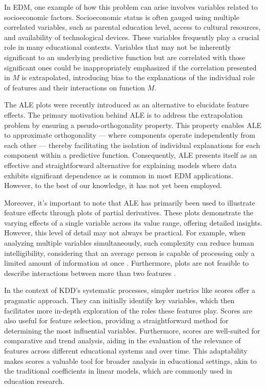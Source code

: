 In \gls{EDM}, one example of how this problem can arise involves variables related to socioeconomic factors. Socioeconomic status is often gauged using multiple correlated variables, such as parental education level, access to cultural resources, and availability of technological devices. These variables frequently play a crucial role in many educational contexts. Variables that may not be inherently significant to an underlying predictive function but are correlated with those significant ones could be inappropriately emphasized if the correlation presented in \(M\) is extrapolated,  introducing bias to the explanations of the individual role of features and their interactions on function \(M\).

The \gls{ALE} plots \cite{Apley2020VisualizingModels} were recently introduced as an alternative to elucidate feature effects. The primary motivation behind \gls{ALE} is to address the extrapolation problem by ensuring a pseudo-orthogonality property. This property enables ALE to approximate orthogonality — where components operate independently from each other — thereby facilitating the isolation of individual explanations for each component within a predictive function. Consequently, \gls{ALE} presents itself as an effective and straightforward alternative for explaining models where data exhibits significant dependence as is common in most \gls{EDM} applications. However, to the best of our knowledge, it has not yet been employed. 

Moreover, it's important to note that \gls{ALE} has primarily been used to illustrate feature effects through plots of partial derivatives. These plots demonstrate the varying effects of a single variable across its value range, offering detailed insights. However, this level of detail may not always be practical. For example, when analyzing multiple variables simultaneously, such complexity can reduce human intelligibility, considering that an average person is capable of processing only a limited amount of information at once \cite{Miller1956TheInformation.}. Furthermore, plots are not feasible to describe interactions between more than two features \cite{Apley2020VisualizingModels}.

In the context of \gls{KDD}'s systematic processes, simpler metrics like scores offer a pragmatic approach. They can initially identify key variables, which then facilitates more in-depth exploration of the roles these features play. Scores are also useful for feature selection, providing a straightforward method for determining the most influential variables. Furthermore, scores are well-suited for comparative and trend analysis, aiding in the evaluation of the relevance of features across different educational systems and over time. This adaptability makes scores a valuable tool for broader analysis in educational settings, akin to the traditional coefficients in linear models, which are commonly used in education research.

